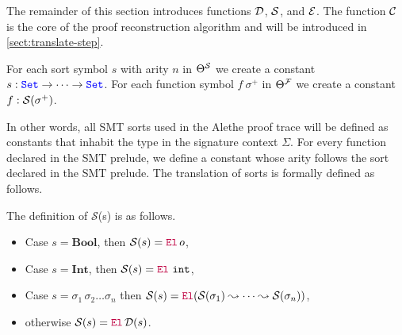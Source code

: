 The remainder of this section introduces functions $\cal{D}$, $\cal{S}$, and $\cal{E}$. The function $\cal{C}$ is the core of the proof reconstruction algorithm and will be introduced in \cref{sect:translate-step}.

\smallskip

\begin{definition}
For each sort symbol $s$ with arity $n$ in $\Theta^\cal{S}$ we create a constant $s: \set \ra \dots \ra \set$.
For each function symbol $f~\sigma^+$ in $\Theta^\cal{F}$ we create a constant $f: \cal{S}(\sigma^+)$.
\end{definition}

\smallskip

In other words, all SMT sorts used in the Alethe proof trace will be defined as constants that inhabit the type \set{} in the signature context $\Sigma$.
For every function declared in the SMT prelude, we define a constant whose arity follows the sort declared in the SMT prelude. The translation of sorts is formally defined as follows.

\smallskip

\begin{definition} 
  The definition of $\mathcal{S}$(s) is as follows.
  \begin{itemize}
    \item Case $s = \textbf{Bool}$, then $\Sort{s} = \el\,o$,
    \item Case $s = \textbf{Int}$, then $\Sort{s} = \el~\texttt{int}$,
    \item Case $s = \sigma_1\,\sigma_2 \dots \sigma_n$ then $\Sort{s} = \el{} (\mathcal{S}(\sigma_1) \leadsto \dots \leadsto \mathcal{S}(\sigma_n))$,
    \item otherwise $\Sort{s} = \el\, \mathcal{D}(s)$.
  \end{itemize}
\end{definition}


